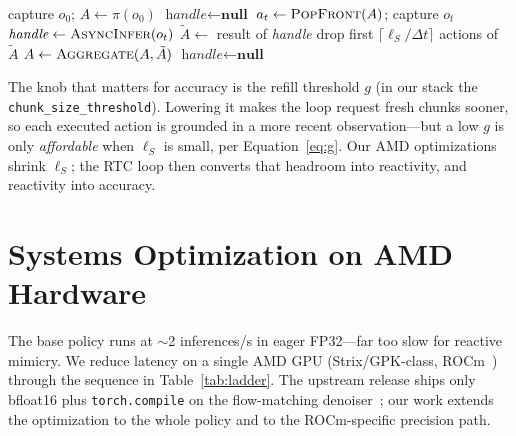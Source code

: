 \documentclass[blind]{gtac}
\begin{document}
\begin{algorithm}[H]
\footnotesize
\caption{Asynchronous Real-Time Chunking control loop}
\label{alg:rtc}
\begin{algorithmic}[1]
\State capture $o_0$; \; $A \gets \pi(o_0)$ 
\State $\textit{handle} \gets \textbf{null}$
  \State $a_t \gets \Call{PopFront}{A}$; \; 
     \State capture $o_{t}$
      
        \State $\textit{handle} \gets \Call{AsyncInfer}{o_{t}}$ 
     \EndIf
  \EndIf
     \State $\tilde{A} \gets$ result of \textit{handle}
     \State drop first $\lceil \ell_S/\Delta t\rceil$ actions of $\tilde{A}$
     \State $A \gets \Call{Aggregate}{A, \tilde{A}}$ 
     \State $\textit{handle} \gets \textbf{null}$
  \EndIf
\EndFor
\end{algorithmic}
\end{algorithm}

The knob that matters for accuracy is the refill threshold $g$ (in our stack the
\texttt{chunk\_size\_threshold}). Lowering it makes the loop request fresh chunks
sooner, so each executed action is grounded in a more recent observation---but a
low $g$ is only \emph{affordable} when $\ell_S$ is small, per
Equation~\eqref{eq:g}. Our AMD optimizations shrink $\ell_S$; the RTC loop then
converts that headroom into reactivity, and reactivity into accuracy.

\section{Systems Optimization on AMD Hardware}
\label{sec:amd}

The base policy runs at $\sim$2 inferences/s in eager FP32---far too slow for
reactive mimicry. We reduce latency on a single AMD GPU (Strix/GPK-class,
ROCm~\cite{rocm}) through the sequence in Table~\ref{tab:ladder}. The upstream
release ships only bfloat16 plus \texttt{torch.compile} on the flow-matching
denoiser~\cite{smolvla,pytorch2}; our work extends the optimization to the whole
policy and to the ROCm-specific precision path.
\end{document}
